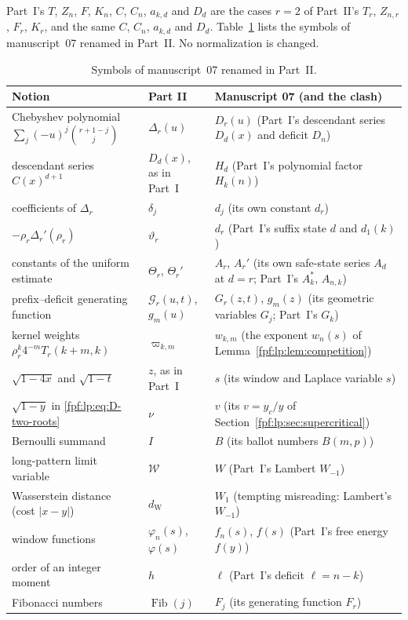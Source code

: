 \documentclass[11pt]{article}
\numberwithin{equation}{section}
\theoremstyle{definition}
\begin{document}
Part~I's $T$, $Z_n$, $F$, $K_n$, $C$, $C_n$, $a_{k,d}$ and $D_d$ are the cases
$r=2$ of Part~II's $T_r$, $Z_{n,r}$, $F_r$, $K_r$, and the same $C$, $C_n$,
$a_{k,d}$ and $D_d$. Table~\ref{fpf:lp:tab:dictionary} lists the symbols of
manuscript~07 renamed in Part~II. No normalization is changed.

\begin{table}[htbp]
\centering\small
\renewcommand{\arraystretch}{1.12}
\begin{tabular}{@{}>{\raggedright\arraybackslash}p{}>{\raggedright\arraybackslash}p{}>{\raggedright\arraybackslash}p{}@{}}
\toprule
Notion & Part II & Manuscript 07 (and the clash)\\
\midrule
Chebyshev polynomial $\sum_j(-u)^j\binom{r+1-j}j$ & $\Delta_r(u)$ & $D_r(u)$ (Part~I's descendant series $D_d(x)$ and deficit $D_n$)\\
descendant series $C(x)^{d+1}$ & $D_d(x)$, as in Part~I & $H_d$ (Part~I's polynomial factor $H_k(n)$)\\
coefficients of $\Delta_r$ & $\delta_j$ & $d_j$ (its own constant $d_r$)\\
$-\rho_r\Delta_r'(\rho_r)$ & $\vartheta_r$ & $d_r$ (Part~I's suffix state $d$ and $d_1(k)$)\\
constants of the uniform estimate & $\Theta_r$, $\Theta_r'$ & $A_r$, $A_r'$ (its own safe-state series $A_d$ at $d=r$; Part~I's $A_k^*$, $A_{n,k}$)\\
prefix--deficit generating function & $\mathcal G_r(u,t)$, $g_m(u)$ & $G_r(z,t)$, $g_m(z)$ (its geometric variables $G_j$; Part~I's $G_k$)\\
kernel weights $\rho_r^k4^{-m}T_r(k+m,k)$ & $\varpi_{k,m}$ & $w_{k,m}$ (the exponent $w_n(s)$ of Lemma~\ref{fpf:lp:lem:competition})\\
$\sqrt{1-4x}$ and $\sqrt{1-t}$ & $z$, as in Part~I & $s$ (its window and Laplace variable $s$)\\
$\sqrt{1-y}$ in \eqref{fpf:lp:eq:D-two-roots} & $\nu$ & $v$ (its $v=y_c/y$ of Section~\ref{fpf:lp:sec:supercritical})\\
Bernoulli summand & $I$ & $B$ (its ballot numbers $B(m,p)$)\\
long-pattern limit variable & $\mathcal W$ & $W$ (Part~I's Lambert $W_{-1}$)\\
Wasserstein distance (cost $|x-y|$) & $d_{\mathrm W}$ & $W_1$ (tempting misreading: Lambert's $W_{-1}$)\\
window functions & $\varphi_n(s)$, $\varphi(s)$ & $f_n(s)$, $f(s)$ (Part~I's free energy $f(y)$)\\
order of an integer moment & $h$ & $\ell$ (Part~I's deficit $\ell=n-k$)\\
Fibonacci numbers & $\operatorname{Fib}(j)$ & $F_j$ (its generating function $F_r$)\\
\bottomrule
\end{tabular}
\caption{Symbols of manuscript~07 renamed in Part~II.}
\label{fpf:lp:tab:dictionary}
\end{table}
\end{document}
